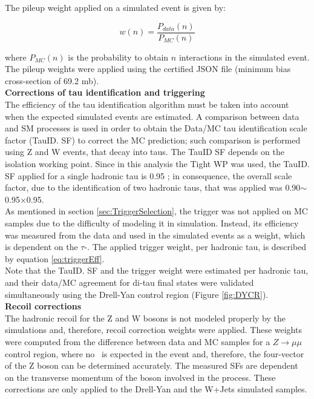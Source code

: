 \noindent The pileup weight applied on a simulated event is given by:

\begin{equation}
w(n) = \frac{P_{data}(n)}{P_{MC}(n)}
\end{equation}

\noindent where $P_{MC}(n)$ is the probability to 
obtain $n$ interactions in the simulated event. The pileup weights 
were applied using the certified JSON file (minimum bias 
cross-section of 69.2 mb).\\

\textbf{Corrections of tau identification and triggering} \\

\noindent The efficiency of the tau identification algorithm 
must be taken into account when the expected 
simulated events are estimated. A comparison 
between data and SM processes is used in order 
to obtain the Data/MC tau identification scale factor (TauID. SF)
to correct the MC prediction; such comparison is performed using 
Z and W events, that decay into taus. The TauID SF depends on the 
isolation working point. Since in this analysis the Tight WP was used,
the TauID. SF applied for a single hadronic tau is 0.95 
\cite{CMS-PAS-TAU-16-002}; in consequence, the overall scale factor,
due to the identification of two hadronic taus, that was 
applied was 0.90$\sim$0.95$\times$0.95.\\

\noindent As mentioned in section \ref{sec:TriggerSelection}, the trigger
was not applied on MC samples due to the difficulty of modeling 
it in simulation. Instead, its efficiency was measured from the data 
and used in the simulated events as a weight, which is dependent on 
the $\tau$-\pt. The  applied trigger weight, per hadronic tau,
is described by equation \ref{eq:triggerEff}. \\

\noindent Note that the TauID. SF and the trigger weight were 
estimated per hadronic tau, and their data/MC agreement
for di-tau final states were validated simultaneously 
using the Drell-Yan control region (Figure \ref{fig:DYCR}).\\

\textbf{Recoil corrections} \\

\noindent The hadronic recoil for the Z and W bosons is not modeled properly
by the simulations and, therefore, recoil correction weights were applied. These
weights were computed from the difference between data and MC samples for a 
$Z\rightarrow\mu\mu$ control region, where no \MET~is expected 
in the event and, therefore, the four-vector of the Z boson can be 
determined accurately. The measured SFs are dependent on the 
transverse momentum of the boson involved in the process. These corrections
are only applied to the Drell-Yan and the W+Jets simulated samples.

